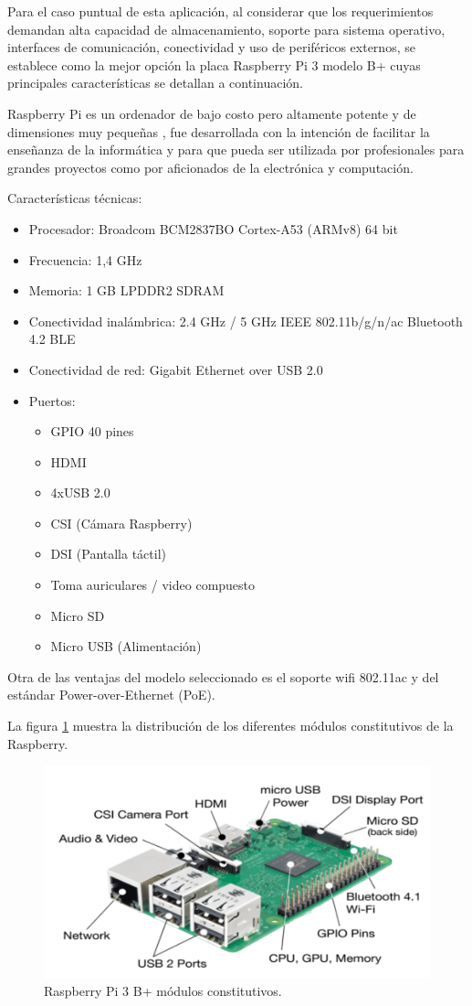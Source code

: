 Para el caso puntual de esta aplicación, al considerar que los requerimientos demandan alta capacidad de almacenamiento, soporte para sistema operativo, interfaces de comunicación, conectividad y uso de periféricos externos, se establece como la mejor opción la placa Raspberry Pi 3 modelo B+ cuyas principales características se detallan a continuación.

Raspberry Pi es un ordenador de bajo costo pero altamente potente y de dimensiones muy pequeñas , fue desarrollada con la intención de facilitar la enseñanza de la informática y para que pueda ser utilizada por profesionales para grandes proyectos como por aficionados de la electrónica y computación.


Características técnicas:
\begin{itemize}
\item Procesador: Broadcom BCM2837BO Cortex-A53 (ARMv8) 64 bit
\item Frecuencia: 1,4 GHz
\item Memoria: 1 GB LPDDR2 SDRAM
\item Conectividad inalámbrica: 2.4 GHz / 5 GHz IEEE 802.11b/g/n/ac Bluetooth 4.2 BLE
\item Conectividad de red: Gigabit Ethernet over USB 2.0
\item Puertos:
\begin{itemize}
\item GPIO 40 pines
\item HDMI
\item 4xUSB 2.0
\item CSI (Cámara Raspberry)
\item DSI (Pantalla táctil)
\item Toma auriculares / video compuesto
\item Micro SD
\item Micro USB (Alimentación) 
\end{itemize}
\end{itemize}
Otra de las ventajas del modelo seleccionado es el soporte wifi 802.11ac y del estándar Power-over-Ethernet (PoE).

La figura \ref{fig:rasp} muestra la distribución de los diferentes módulos constitutivos de la Raspberry.

\begin{figure}[H]
	\centering
	\includegraphics[scale=.7]{./Figures/rasp.pdf}
	\caption{Raspberry Pi 3 B+ módulos constitutivos.}
	\label{fig:rasp}
\end{figure}
 
